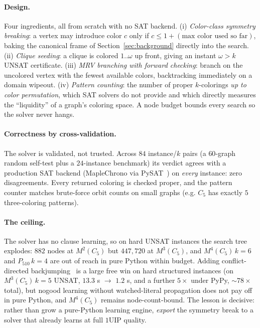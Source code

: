 \documentclass[11pt]{article}
\theoremstyle{definition}
\begin{document}
\paragraph{Design.} Four ingredients, all from scratch with no SAT backend.
(i) \emph{Color-class symmetry breaking}: a vertex may introduce color $c$ only if
$c \le 1 + (\text{max color used so far})$, baking the canonical frame of
Section~\ref{sec:background} directly into the search. (ii) \emph{Clique seeding}:
a clique is colored $1..\omega$ up front, giving an instant $\omega > k$ UNSAT
certificate. (iii) \emph{MRV branching with forward checking}: branch on the
uncolored vertex with the fewest available colors, backtracking immediately on a
domain wipeout. (iv) \emph{Pattern counting}: the number of proper $k$-colorings
\emph{up to color permutation}, which SAT solvers do not provide and which
directly measures the ``liquidity'' of a graph's coloring space. A node budget
bounds every search so the solver never hangs.

\paragraph{Correctness by cross-validation.} The solver is validated, not
trusted. Across $84$ instance/$k$ pairs (a $60$-graph random self-test plus a
$24$-instance benchmark) its verdict agrees with a production SAT backend
(MapleChrono via PySAT~\cite{IgnatievPySAT}) on \emph{every} instance: zero
disagreements. Every returned coloring is checked proper, and the pattern counter
matches brute-force orbit counts on small graphs (e.g. $C_5$ has exactly $5$
three-coloring patterns).

\paragraph{The ceiling.} The solver has no clause learning, so on hard UNSAT
instances the search tree explodes: $882$ nodes at $M^2(C_5)$ but $447{,}720$ at
$M^3(C_5)$, and $M^4(C_5)\,k{=}6$ and $P_{510}\,k{=}4$ are out of reach in pure
Python within budget. Adding conflict-directed backjumping~\cite{Prosser1993} is a
large free win on hard structured instances (on $M^3(C_5)\,k{=}5$ UNSAT, $13.3$ s
$\to$ $1.2$ s, and a further $5\times$ under PyPy, $\sim\!78\times$ total), but
nogood learning without watched-literal propagation does not pay off in pure
Python, and $M^4(C_5)$ remains node-count-bound. The lesson is decisive: rather
than grow a pure-Python learning engine, \emph{export} the symmetry break to a
solver that already learns at full $1$UIP quality.
\end{document}
